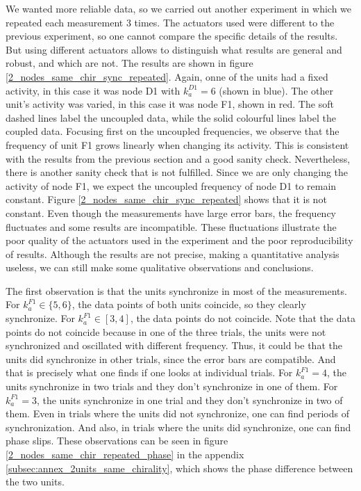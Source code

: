 \documentclass[11pt, a4paper]{article} %
\begin{document}
We wanted more reliable data, so we carried out another experiment in which we repeated each measurement 3 times. The actuators used 
were different to the previous experiment, so one cannot compare the specific details of the results. But using different actuators 
allows to distinguish what results are general and robust, and which are not. The results are shown 
in figure \ref{2_nodes_same_chir_sync_repeated}. Again, onne of the units had a fixed activity, in this case it was node D1 
with $k_a^{D1} = 6$ (shown in blue). The other unit's activity was varied, in this case it was node F1, shown in red. 
The soft dashed lines label the uncoupled data, while the solid colourful lines label the coupled data. 
Focusing first on the uncoupled frequencies, we observe that the frequency of unit F1 grows linearly when changing its 
activity. This is consistent with the results from the previous section and a good sanity check. 
Nevertheless, there is another sanity check that is not fulfilled. %
Since we are only changing the activity of node F1, we expect the uncoupled frequency of node D1 to remain constant. 
Figure \ref{2_nodes_same_chir_sync_repeated} shows that it is not constant. Even though the measurements have 
large error bars, the frequency fluctuates and some results are incompatible. These fluctuations illustrate the 
poor quality of the actuators used in the experiment and the poor reproducibility of results. 
Although the results are not precise, making a quantitative analysis useless, we can still make some qualitative observations and conclusions. 


The first observation is that the units synchronize in most of the measurements. For $k_a^{F1} \in \{5,6\}$, 
the data points of both units coincide, so they clearly synchronize. 
For $k_a^{F1} \in [3, 4]$, the data points do not coincide. Note that the data points do not coincide 
because in one of the three trials, the units were not synchronized and oscillated with different frequency. Thus, 
it could be that the units did synchronize in other trials, since the error bars are compatible. And that is precisely
what one finds if one looks at individual trials. For $k_a^{F1} = 4$, the units synchronize in two trials and 
they don't synchronize in one of them. For $k_a^{F1} = 3$, the units synchronize in one trial and they don't synchronize in two of them.
Even in trials where the units did not synchronize, one can find periods of synchronization. And also, in trials 
where the units did synchronize, one can find phase slips. These observations can be seen in figure 
\ref{2_nodes_same_chir_repeated_phase} in the appendix \ref{subsec:annex_2units_same_chirality}, 
which shows the phase difference between the two units.
\end{document}
